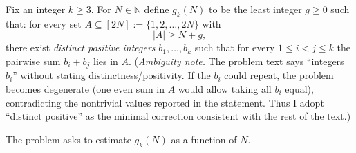 Fix an integer $k\ge 3$. For $N\in\mathbb{N}$ define $g_k(N)$ to be the least integer $g\ge 0$ such that:
for every set $A\subseteq [2N]:=\{1,2,\dots,2N\}$ with
\[
|A|\ge N+g,
\]
there exist \emph{distinct positive integers} $b_1,\dots,b_k$ such that for every $1\le i<j\le k$ the pairwise sum $b_i+b_j$ lies in $A$.
(\emph{Ambiguity note.} The problem text says ``integers $b_i$'' without stating distinctness/positivity. If the $b_i$ could repeat, the problem becomes degenerate (one even sum in $A$ would allow taking all $b_i$ equal), contradicting the nontrivial values reported in the statement. Thus I adopt ``distinct positive'' as the minimal correction consistent with the rest of the text.)

The problem asks to estimate $g_k(N)$ as a function of $N$.
